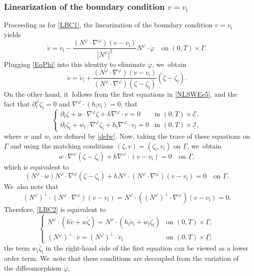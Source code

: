 \documentclass[JEP,XML,SOM,Unicode,NoFloatCountersInSection,published]{cedram}
\newcommand{\dt}{\partial_t}
\newcommand{\cI}{{\mathcal I}}
\newcommand{\cE}{{\mathcal E}}
\newcommand{\ul}[1]{\underline{#1}}
\newcommand{\itGamma}{\mathit{\Gamma}}
\theoremstyle{definition}
\begin{document}
\subsubsection{Linearization of the boundary condition $v=v_\mathrm{i}$}
Proceeding as for \eqref{LBC1}, the linearization of the boundary condition $v=v_\mathrm{i}$ yields
\[
\check{v}=\check{v}_\mathrm{i}-\frac{(N^\varphi\cdot\nabla^\varphi)(v-v_\mathrm{i})}{|N^\varphi|^2} N^\varphi\cdot\dot{\varphi}
\quad\text{on } (0,T)\times\ul{\itGamma}.
\]
Plugging \eqref{EqPhi} into this identity to eliminate $\dot{\varphi}$, we~obtain
\begin{equation}\label{LBC2}
\check{v} = \check{v}_\mathrm{i}
+ \frac{(N^\varphi\cdot\nabla^\varphi)(v-v_\mathrm{i})}{(N^\varphi\cdot\nabla^\varphi)(\zeta-\zeta_\mathrm{i})} (\check{\zeta}-\check{\zeta}_\mathrm{i}).
\end{equation}
On the other hand, it~follows from the first equations in \eqref{NLSWEe5},
and the fact that $\dt^\varphi\zeta_\mathrm{i}=0$ and $\nabla^\varphi\cdot(h_\mathrm{i}v_\mathrm{i})=0$, that
\[
\begin{cases}
\dt\zeta+w\cdot\nabla^\varphi\zeta+h\nabla^\varphi\cdot v=0 &\text{in } (0,T)\times\ul{\cE}, \\
\dt\zeta_\mathrm{i}+w_\mathrm{i}\cdot\nabla^\varphi\zeta_\mathrm{i}+h_\mathrm{i}\nabla^\varphi\cdot v_\mathrm{i}=0 &\text{in } (0,T)\times\ul{\cI},
\end{cases}
\]
where $w$ and $w_\mathrm{i}$ are defined by \eqref{defw}.
Now, taking the trace of these equations on $\ul{\itGamma}$ and using the matching conditions $(\zeta,v)=(\zeta_\mathrm{i},v_\mathrm{i})$ on $\ul{\itGamma}$, we~obtain
\[
w\cdot\nabla^\varphi(\zeta-\zeta_\mathrm{i})+h\nabla^\varphi\cdot(v-v_\mathrm{i})=0\quad \text{on }\ul{\itGamma},
\]
which is equivalent to
\[
(N^\varphi\cdot w)N^\varphi\cdot\nabla^\varphi(\zeta-\zeta_\mathrm{i})+hN^\varphi\cdot(N^\varphi\cdot\nabla^\varphi)(v-v_\mathrm{i})=0\quad \text{on }\ul{\itGamma}.
\]
We~also note that
\[
(N^\varphi)^\perp\cdot(N^\varphi\cdot\nabla^\varphi)(v-v_\mathrm{i})=N^\varphi\cdot((N^\varphi)^\perp\cdot\nabla^\varphi)(v-v_\mathrm{i})=0.
\]
Therefore, \eqref{LBC2} is equivalent to
\begin{equation}\label{LBC3}
\begin{cases}
N^\varphi\cdot(h\check{v}+w\check{\zeta})=N^\varphi\cdot(h_\mathrm{i}\check{v}_\mathrm{i}+w_\mathrm{i}\check{\zeta}_\mathrm{i}) &\text{on } (0,T)\times\ul{\itGamma}, \\
(N^\varphi)^\perp\cdot\check{v}=(N^\varphi)^\perp\cdot\check{v}_\mathrm{i} &\text{on } (0,T)\times\ul{\itGamma};
\end{cases}
\end{equation}
the term $w_\mathrm{i}\check{\zeta}_\mathrm{i}$ in the right-hand side of the first equation can be viewed as a lower order term. We~note that these conditions are decoupled from the variation of the diffeomorphism $\dot{\varphi}$.
\end{document}

